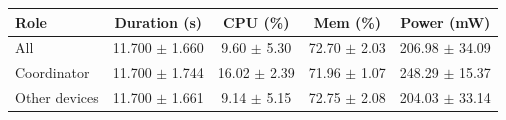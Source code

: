 \begin{tabular}{lcccc}
\hline
\textbf{Role} & \textbf{Duration (s)} & \textbf{CPU (\%)} & \textbf{Mem (\%)} & \textbf{Power (mW)} \\
\hline
All & 11.700 $\pm$ 1.660 & 9.60 $\pm$ 5.30 & 72.70 $\pm$ 2.03 & 206.98 $\pm$ 34.09 \\
Coordinator & 11.700 $\pm$ 1.744 & 16.02 $\pm$ 2.39 & 71.96 $\pm$ 1.07 & 248.29 $\pm$ 15.37 \\
Other devices & 11.700 $\pm$ 1.661 & 9.14 $\pm$ 5.15 & 72.75 $\pm$ 2.08 & 204.03 $\pm$ 33.14 \\
\hline
\end{tabular}

